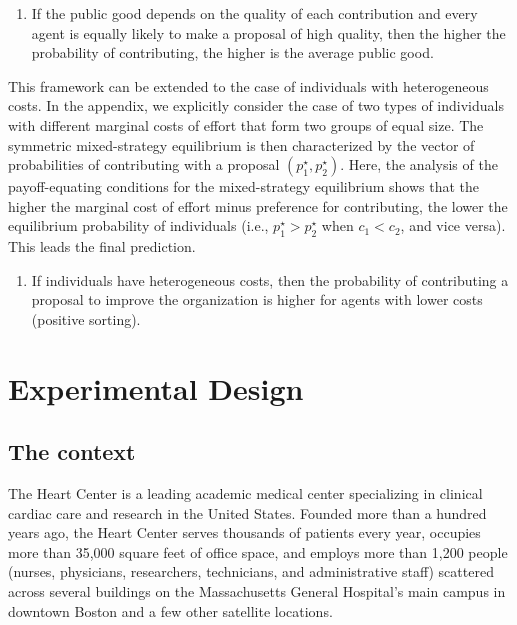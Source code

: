 \documentclass[11pt, titlepage]{article}
\providecommand{\tightlist}{%
  \setlength{\itemsep}{0pt}\setlength{\parskip}{0pt}}
\begin{document}
\begin{enumerate}
\def\labelenumi{\arabic{enumi})}
\setcounter{enumi}{3}
\tightlist
\item
  If the public good depends on the quality of each contribution and
  every agent is equally likely to make a proposal of high quality, then
  the higher the probability of contributing, the higher is the average
  public good.
\end{enumerate}

This framework can be extended to the case of individuals with
heterogeneous costs. In the appendix, we explicitly consider the case of
two types of individuals with different marginal costs of effort that
form two groups of equal size. The symmetric mixed-strategy equilibrium
is then characterized by the vector of probabilities of contributing
with a proposal \((p_1^\star, p_2^\star)\). Here, the analysis of the
payoff-equating conditions for the mixed-strategy equilibrium shows that
the higher the marginal cost of effort minus preference for
contributing, the lower the equilibrium probability of individuals
(i.e., \(p_1^\star > p_2^\star\) when \(c_1 < c_2\), and vice versa).
This leads the final prediction.

\begin{enumerate}
\def\labelenumi{\arabic{enumi})}
\setcounter{enumi}{4}
\tightlist
\item
  If individuals have heterogeneous costs, then the probability of
  contributing a proposal to improve the organization is higher for
  agents with lower costs (positive sorting).
\end{enumerate}

\section{Experimental Design}\label{experimental-design}

\subsection{The context}\label{the-context}

The Heart Center is a leading academic medical center specializing in
clinical cardiac care and research in the United States. Founded more
than a hundred years ago, the Heart Center serves thousands of patients
every year, occupies more than 35,000 square feet of office space, and
employs more than 1,200 people (nurses, physicians, researchers,
technicians, and administrative staff) scattered across several
buildings on the Massachusetts General Hospital's main campus in
downtown Boston and a few other satellite locations.
\end{document}
